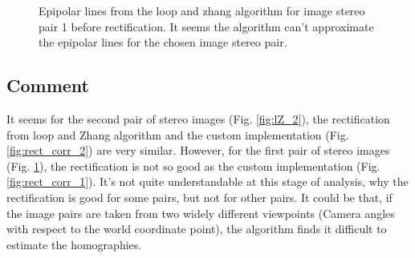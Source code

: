 \documentclass{article}
\begin{document}
\begin{figure}[!htbp]
     \centering
     \captionsetup[subfigure]{labelformat=empty}
    \caption{Epipolar lines from the loop and zhang algorithm for image stereo pair 1 before rectification. It seems the algorithm can't approximate the epipolar lines for the chosen image stereo pair.}
    \label{fig:lZ_1}
\end{figure}


\subsection*{Comment}
It seems for the second pair of stereo images (Fig. \ref{fig:lZ_2}), the rectification from loop and Zhang algorithm and the custom implementation (Fig. \ref{fig:rect_corr_2}) are very similar. However, for the first pair of stereo images (Fig. \ref{fig:lZ_1}), the rectification is not so good as the custom implementation (Fig. \ref{fig:rect_corr_1}). It's not quite understandable at this stage of analysis, why the rectification is good for some pairs, but not for other pairs. It could be that, if the image pairs are taken from two widely different viewpoints (Camera angles with respect to the world coordinate point), the algorithm finds it difficult to estimate the homographies. 
\end{document}
